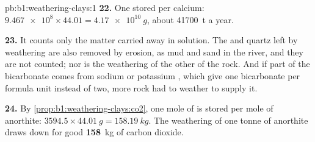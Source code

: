 \begin{solution}{pb:b1:weathering-clays:1}
\textbf{22.} One  stored per calcium: $\num{9.467e8} \times 44.01 =
\qty{4.17e10}{g}$, about \qty{41700}{t} a year.

\textbf{23.} It counts only the matter carried away in solution. The 
and quartz left by weathering are also removed by erosion, as mud and sand in
the river, and they are not counted; nor is the weathering of the other
 of the rock. And if part of the bicarbonate comes from sodium or
potassium , which give one bicarbonate per formula unit instead of
two, more rock had to weather to supply it.

\textbf{24.} By \cref{prop:b1:weathering-clays:co2}, one mole of  is
stored per mole of anorthite: $3594.5 \times \qty{44.01}{g} = \qty{158.19}{kg}$.
The weathering of one tonne of anorthite draws down for good
\textbf{158}~kg of carbon dioxide.
\end{solution}
